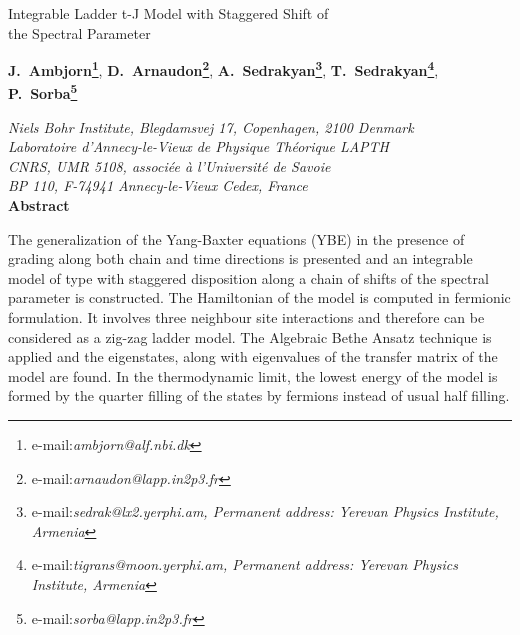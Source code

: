 \documentclass[a4paper,12pt]{article}
\def\ZZ{{\mathbb Z}}
\begin{document}
\pagestyle{empty}

\begin{center} 
  {\Large \textsf{
      Integrable Ladder t-J Model with Staggered Shift of                    
      \\[4mm]
      the Spectral Parameter}} 
  
\vspace{36pt}
{\bf J.~Ambjorn\coordHE{}\footnote{e-mail:{\sl ambjorn@alf.nbi.dk}}},
{\bf D.~Arnaudon\coordHE{}\footnote{e-mail:{\sl arnaudon@lapp.in2p3.fr}}},
{\bf A.~Sedrakyan\coordHE{}\footnote{e-mail:{\sl sedrak@lx2.yerphi.am,
Permanent address: Yerevan Physics Institute, Armenia}}},
{\bf T.~Sedrakyan\coordHE{}\footnote{e-mail:{\sl tigrans@moon.yerphi.am,
Permanent address: Yerevan Physics Institute, Armenia}}},
{\bf P.~Sorba\coordHE{}\footnote{e-mail:{\sl sorba@lapp.in2p3.fr}}}\\  


\vfill

\emph{\coordHE{}Niels Bohr Institute, Blegdamsvej 17, Copenhagen, 2100 Denmark}
\\[4mm]
\emph{\coordHE{}Laboratoire d'Annecy-le-Vieux de Physique Th{\'e}orique LAPTH}
\\
\emph{CNRS, UMR 5108, associ{\'e}e {\`a} l'Universit{\'e} de Savoie}
\\
\emph{BP 110, F-74941 Annecy-le-Vieux Cedex, France}
\\

\vfill
{\bf Abstract}

\end{center}

The generalization of the Yang-Baxter equations (YBE) in the presence
of \myHighlight{$\ZZ_2$}\coordHE{} grading along both chain and time directions is presented
and an integrable model of \coordHE{} type 
with staggered disposition along a chain of shifts of the spectral 
parameter is constructed. The Hamiltonian of the model is computed in 
fermionic formulation. It involves three neighbour site interactions
and therefore can be considered as a zig-zag ladder model. The Algebraic
Bethe Ansatz technique is applied and the eigenstates, along with
eigenvalues of the transfer matrix of the model are found.
In the thermodynamic limit, the lowest energy of the
model is formed by the quarter filling of the states by fermions
instead of usual half filling.
\end{document}
